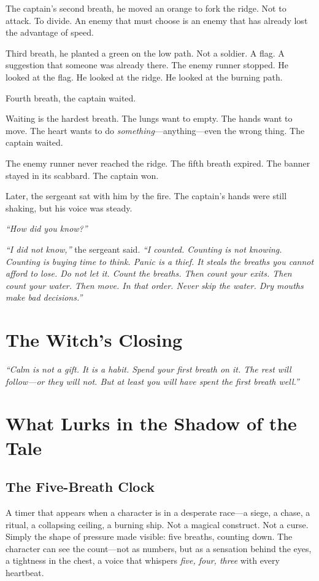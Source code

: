 The captain's second breath, he moved an orange to fork the ridge. Not to attack. To divide. An enemy that must choose is an enemy that has already lost the advantage of speed.

Third breath, he planted a green on the low path. Not a soldier. A flag. A suggestion that someone was already there. The enemy runner stopped. He looked at the flag. He looked at the ridge. He looked at the burning path.

Fourth breath, the captain waited.

Waiting is the hardest breath. The lungs want to empty. The hands want to move. The heart wants to do \textit{something}—anything—even the wrong thing. The captain waited.

The enemy runner never reached the ridge. The fifth breath expired. The banner stayed in its scabbard. The captain won.

Later, the sergeant sat with him by the fire. The captain's hands were still shaking, but his voice was steady.

\textit{``How did you know?''}

\textit{``I did not know,''} the sergeant said. \textit{``I counted. Counting is not knowing. Counting is buying time to think. Panic is a thief. It steals the breaths you cannot afford to lose. Do not let it. Count the breaths. Then count your exits. Then count your water. Then move. In that order. Never skip the water. Dry mouths make bad decisions.''}

\section*{The Witch's Closing}
\textit{``Calm is not a gift. It is a habit. Spend your first breath on it. The rest will follow—or they will not. But at least you will have spent the first breath well.''}

\section*{What Lurks in the Shadow of the Tale}

\subsection*{The Five-Breath Clock}

A timer that appears when a character is in a desperate race—a siege, a chase, a ritual, a collapsing ceiling, a burning ship. Not a magical construct. Not a curse. Simply the shape of pressure made visible: five breaths, counting down. The character can see the count—not as numbers, but as a sensation behind the eyes, a tightness in the chest, a voice that whispers \textit{five, four, three} with every heartbeat.

